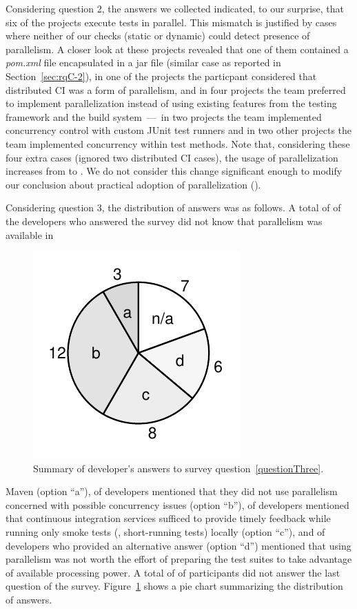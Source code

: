 Considering question 2, the answers we collected indicated, to our
surprise, that six of the \emailsProjectsAnswered{} projects execute
tests in parallel.  This mismatch is justified by cases where neither
of our checks (static or dynamic) could detect presence of
parallelism.  A closer look at these projects revealed that one of
them contained a \emph{pom.xml} file encapsulated in a jar file
(similar case as reported in Section~\ref{sec:rqC-2}), in one of the
projects the particpant considered that distributed CI was a form of
parallelism, and in four projects the team preferred to implement
parallelization instead of using existing features from the testing
framework and the build system~---~in two projects the team
implemented concurrency control with custom JUnit test runners and in
two other projects the team implemented concurrency within test
methods.  Note that, considering these four extra cases (ignored two
distributed CI cases), the usage of parallelization increases from
\percentParallel{} to \percentParallelUpdated{}.  We do not consider
this change significant enough to modify our conclusion about
practical adoption of parallelization (\numRQC{}).



Considering question 3, the distribution of answers was as follows.  A
total of \emailsA{} of the \emailsProjectsAnswered{} developers who
answered the survey did not know that parallelism was available in
\begin{figure}%
    \centering
    \includegraphics[width=.18\textwidth]{plots/survey.pdf}
    \caption{\label{fig:rq5-answers}Summary of developer's answers to
      survey question~\ref{questionThree}.}
\end{figure}
Maven (option ``a''), \emailsB{} of developers mentioned that they did
not use parallelism concerned with possible concurrency issues (option
``b''), \emailsD{} of developers mentioned that continuous integration
services sufficed to provide timely feedback while running only smoke
tests (\ie{}, short-running tests) locally (option ``c''), and \emailsD{} of
developers who provided an alternative answer (option ``d'') mentioned
that using parallelism was not worth the effort of preparing the test
suites to take advantage of available processing power.  A total of
\emailsNA{} of participants did not answer the last question of the
survey.  Figure~\ref{fig:rq5-answers} shows a pie chart summarizing
the distribution of answers.

